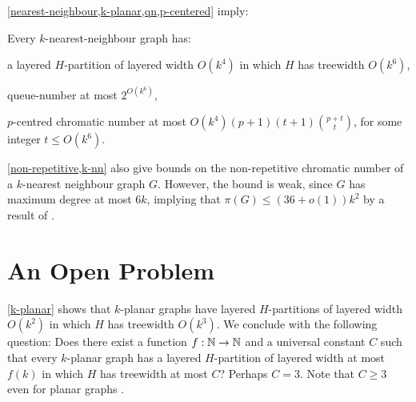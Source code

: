 \documentclass{patmorin}
\renewcommand{\geq}{\geqslant}
\renewcommand{\leq}{\leqslant}
\begin{document}
\cref{nearest-neighbour,k-planar,qn,p-centered} imply:

\begin{cor}
\label{k-nn}
Every $k$-nearest-neighbour graph has:
\begin{compactitem}
\item a layered $H$-partition of layered width $O(k^4)$ in which $H$ has treewidth $O(k^6)$,
\item queue-number at most $2^{O(k^6)}$,
\item $p$-centred chromatic number at most $O(k^4) (p+1) (t+1)\binom{p+t}{t}$, for some integer $t\leq O(k^6)$.
\end{compactitem}
\end{cor}

\cref{non-repetitive,k-nn} also give bounds on the non-repetitive chromatic number of a $k$-nearest neighbour graph $G$. However, the bound is weak, since $G$ has maximum degree at most $6k$, implying that $\pi(G) \leq (36+o(1))k^2$ by a result of \citet{DJKW16}.


\section{An Open Problem}

\cref{k-planar} shows that $k$-planar graphs have layered $H$-partitions of layered width $O(k^2)$ in which $H$ has treewidth $O(k^3)$.  We conclude with the following question:  Does there exist a function $f:\mathbb{N}\to\mathbb{N}$ and a universal constant $C$ such that every $k$-planar graph has a layered $H$-partition of layered width at most $f(k)$ in which $H$ has treewidth at most $C$?  Perhaps $C=3$. Note that $C\geq 3$ even for planar graphs \citep{dujmovic.joret.ea:planar}.  



\end{document}
